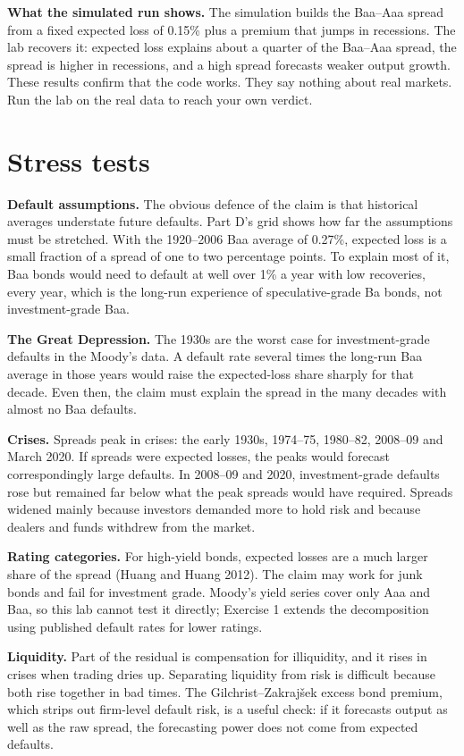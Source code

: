 \textbf{What the simulated run shows.} The simulation builds the Baa--Aaa spread from a fixed expected loss of 0.15\% plus a premium that jumps in recessions. The lab recovers it: expected loss explains about a quarter of the Baa--Aaa spread, the spread is higher in recessions, and a high spread forecasts weaker output growth. These results confirm that the code works. They say nothing about real markets. Run the lab on the real data to reach your own verdict.

\section{Stress tests}
\label{sec:18-stress}

\textbf{Default assumptions.} The obvious defence of the claim is that historical averages understate future defaults. Part D's grid shows how far the assumptions must be stretched. With the 1920--2006 Baa average of 0.27\%, expected loss is a small fraction of a spread of one to two percentage points. To explain most of it, Baa bonds would need to default at well over 1\% a year with low recoveries, every year, which is the long-run experience of speculative-grade Ba bonds, not investment-grade Baa.

\textbf{The Great Depression.} The 1930s are the worst case for investment-grade defaults in the Moody's data. A default rate several times the long-run Baa average in those years would raise the expected-loss share sharply for that decade. Even then, the claim must explain the spread in the many decades with almost no Baa defaults.

\textbf{Crises.} Spreads peak in crises: the early 1930s, 1974--75, 1980--82, 2008--09 and March 2020. If spreads were expected losses, the peaks would forecast correspondingly large defaults. In 2008--09 and 2020, investment-grade defaults rose but remained far below what the peak spreads would have required. Spreads widened mainly because investors demanded more to hold risk and because dealers and funds withdrew from the market.

\textbf{Rating categories.} For high-yield bonds, expected losses are a much larger share of the spread (Huang and Huang 2012). The claim may work for junk bonds and fail for investment grade. Moody's yield series cover only Aaa and Baa, so this lab cannot test it directly; Exercise 1 extends the decomposition using published default rates for lower ratings.

\textbf{Liquidity.} Part of the residual is compensation for illiquidity, and it rises in crises when trading dries up. Separating liquidity from risk is difficult because both rise together in bad times. The Gilchrist--Zakraj\v{s}ek excess bond premium, which strips out firm-level default risk, is a useful check: if it forecasts output as well as the raw spread, the forecasting power does not come from expected defaults.

